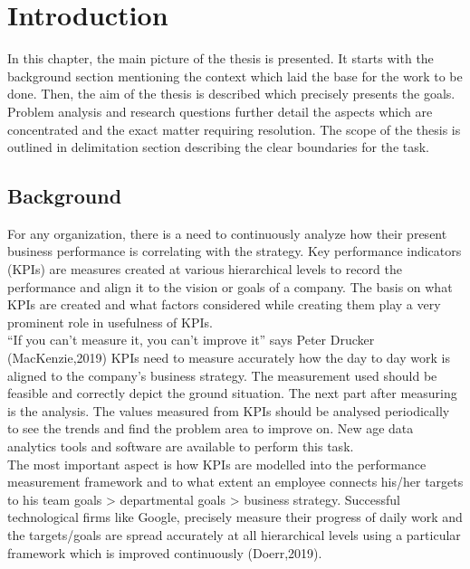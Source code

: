 \chapter{Introduction}
In this chapter, the main picture of the thesis is presented. It starts with the background section mentioning the context which laid the base for the work to be done. Then, the aim of the thesis is described which precisely presents the goals. Problem analysis and research questions further detail the aspects which are concentrated and the exact matter requiring resolution. The scope of the thesis is outlined in delimitation section describing the clear boundaries for the task. \\

\section{Background}
For any organization, there is a need to continuously analyze how their present business performance is correlating with the strategy. Key performance indicators (KPIs) are measures created at various hierarchical levels to record the performance and align it to the vision or goals of a company. The basis on what KPIs are created and what factors considered while creating them play a very prominent role in usefulness of KPIs. \\ 

“If you can’t measure it, you can’t improve it” says Peter Drucker (MacKenzie,2019) KPIs need to measure accurately how the day to day work is aligned to the company’s business strategy. The measurement used should be feasible and correctly depict the ground situation. The next part after measuring is the analysis. The values measured from KPIs should be analysed periodically to see the trends and find the problem area to improve on. New age data analytics tools and software are available to perform this task. \\  

The most important aspect is how KPIs are modelled into the performance measurement framework and to what extent an employee connects his/her targets to his team goals > departmental goals > business strategy. Successful technological firms like Google, precisely measure their progress of daily work and the targets/goals are spread accurately at all hierarchical levels using a particular framework which is improved continuously (Doerr,2019).\\

